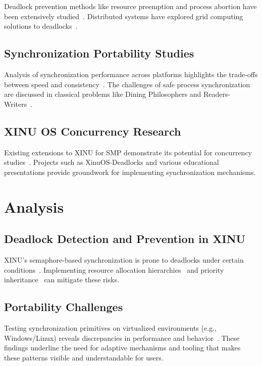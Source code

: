 \documentclass[conference,a4paper]{IEEEtran}
\begin{document}
Deadlock prevention methods like resource preemption and process abortion have been extensively studied~\cite{jetir, bbk}. Distributed systems have explored grid computing solutions to deadlocks~\cite{ijcsns}.

\subsection{Synchronization Portability Studies}

Analysis of synchronization performance across platforms highlights the trade-offs between speed and consistency~\cite{arxiv}. The challenges of safe process synchronization are discussed in classical problems like Dining Philosophers and Readers-Writers~\cite{devto}.

\subsection{XINU OS Concurrency Research}

Existing extensions to XINU for SMP demonstrate its potential for concurrency studies~\cite{xinuosdeadlocks}. Projects such as XinuOS-Deadlocks and various educational presentations provide groundwork for implementing synchronization mechanisms.

\section{Analysis}

\subsection{Deadlock Detection and Prevention in XINU}

XINU’s semaphore-based synchronization is prone to deadlocks under certain conditions~\cite{buffalo}. Implementing resource allocation hierarchies~\cite{jetir} and priority inheritance~\cite{bbk, xinuosdeadlocks} can mitigate these risks.

\subsection{Portability Challenges}

Testing synchronization primitives on virtualized environments (e.g., Windows/Linux) reveals discrepancies in performance and behavior~\cite{arxiv}. These findings underline the need for adaptive mechanisms and tooling that makes these patterns visible and understandable for users.
\end{document}
